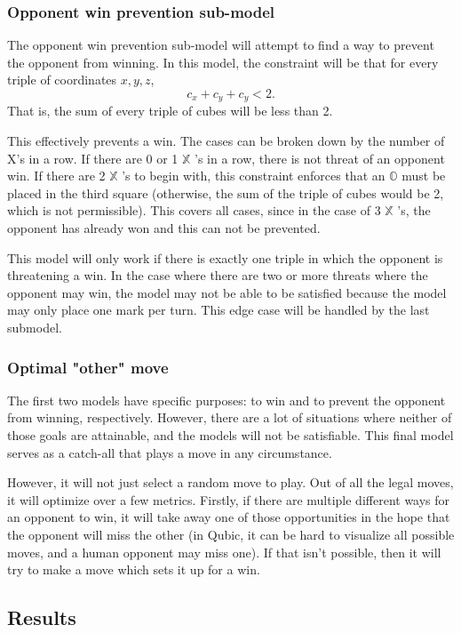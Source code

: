 \documentclass[11pt]{article}
\newcommand{\XX}{$\mathbb{X}$ }
\newcommand{\OO}{$\mathbb{O}$ }
\begin{document}
\subsubsection{Opponent win prevention sub-model}
The opponent win prevention sub-model will attempt to find a way to prevent the opponent from winning. In this model, the constraint will be that for every triple of coordinates $x, y,z$, $$c_x + c_y + c_y < 2.$$ That is, the sum of every triple of cubes will be less than 2.

This effectively prevents a win. The cases can be broken down by the number of X's in a row. If there are 0 or 1 \XX's in a row, there is not threat of an opponent win. If there are 2 \XX's to begin with, this constraint enforces that an \OO must be placed in the third square (otherwise, the sum of the triple of cubes would be 2, which is not permissible). This covers all cases, since in the case of 3 \XX's, the opponent has already won and this can not be prevented. 

This model will only work if there is exactly one triple in which the opponent is threatening a win. In the case where there are two or more threats where the opponent may win, the model may not be able to be satisfied because the model may only place one mark per turn. This edge case will be handled by the last submodel.

\subsubsection{Optimal "other" move}
The first two models have specific purposes: to win and to prevent the opponent from winning, respectively. However, there are a lot of situations where neither of those goals are attainable, and the models will not be satisfiable. This final model serves as a catch-all that plays a move in any circumstance.

However, it will not just select a random move to play. Out of all the legal moves, it will optimize over a few metrics. Firstly, if there are multiple different ways for an opponent to win, it will take away one of those opportunities in the hope that the opponent will miss the other (in Qubic, it can be hard to visualize all possible moves, and a human opponent may miss one). If that isn't possible, then it will try to make a move which sets it up for a win.


\subsection{Results}
\end{document}
